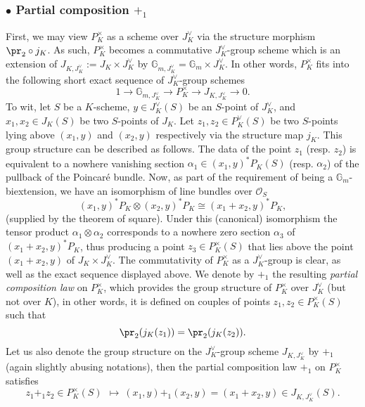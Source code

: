 \documentclass[11pt,oneside]{amsart}
\theoremstyle{plain}
\theoremstyle{definition}
\def\lra{{\longrightarrow}}
\def\G{{\bf G}}
\DeclareMathOperator{\Gm}{\mathbb{G}_m}
\def\G{\mathbb{G}}
\def\Gm{{\mathbb{G}_m}}
\def\oh{\mathcal{O}}
\begin{document}
  \subsubsection*{$\bullet$ Partial composition $+_1$}  First, we may view $P_K^\times$ as a scheme over $J_K^\vee$ via the structure morphism $\pr_2\circ j_K$. As such, $P_K^\times$ becomes a commutative $J_K^\vee$-group scheme which is an extension of $J_{K, J_K^\vee} := J_K \times J_K^\vee$ by $\G_{m, J_K^\vee} = \Gm \times J_K^\vee$. In other words, $P_K^\times$ fits into the following short exact sequence of  $J_K^\vee$-group schemes
    \begin{equation}\label{ext1}
        1 \lra \G_{m, J_K^\vee} \lra P_K^\times \lra J_{K, J_K^\vee} \lra 0.
    \end{equation}
To wit, let $S$ be a $K$-scheme, $y \in J_K^\vee(S)$ be an $S$-point of $J^\vee_K$, and $x_1, x_2 \in J_K(S)$ be two $S$-points of $J_K$. Let $z_1, z_2 \in P_K^\vee (S)$ be two $S$-points lying above $(x_1, y)$ and $(x_2, y)$ respectively via the structure map $j_K$. This group structure can be described as follows. %
The data of the point $z_1$ (resp. $z_2$) is equivalent to a nowhere vanishing section $\alpha_1 \in (x_1, y)^* P_K (S)$ (resp. $\alpha_2$) of the pullback of the Poincar\'e bundle. Now, as part of the requirement of being a $\G_m$-biextension, we have an isomorphism of line bundles over $\oh_S$
    \begin{equation}\label{eq:thm_square}
(x_1, y)^* P_K \otimes (x_2, y)^* P_K \cong (x_1+x_2, y)^* P_K,
\end{equation} (supplied by the theorem of square). 
Under this (canonical) isomorphism the tensor product  $\alpha_1 \otimes \alpha_2$ corresponds to a nowhere zero section $\alpha_3$ of $(x_1+x_2, y)^* P_K$, thus producing a point $z_3 \in P_K^\times(S)$ that lies above the point  $(x_1+ x_2, y)$ of $J_K \times J_K^\vee$. The commutativity of $P_K^\times$ as a $J_K^\vee$-group is clear, as well as the exact sequence displayed above. 
    We denote by $+_1$ the resulting \textit{partial composition law} on $P_K^\times$, which provides the group structure of $P_K^\times$ over $J_K^\vee$ (but not over $K$), in other words, it is defined on couples of points $z_1, z_2\in P_K^\times(S)$ such that $$ \pr_2(j_K(z_1))=\pr_2(j_K(z_2)).$$
   Let us also denote the group structure on the $J_K^\vee$-group scheme $J_{K, J_K^\vee}$ by $+_1$ (again slightly abusing notations), then the partial composition law $+_1$ on $P_K^\times$ satisfies
\[
 z_1 +_1 z_2 \in P_K^\times (S) \:\:  \longmapsto \: (x_1, y) +_1 (x_2, y) = (x_1+x_2, y) \in J_{K, J_K^\vee} (S). 
\]
    
\end{document}
